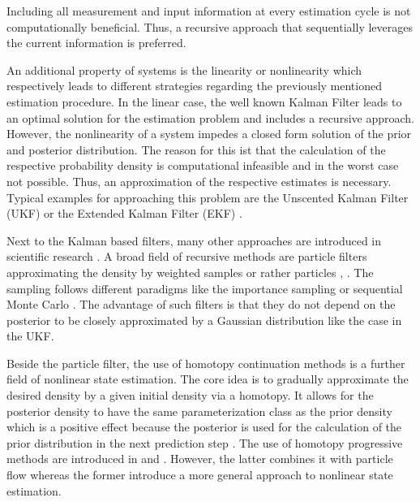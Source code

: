 \documentclass[a4paper]{IEEEtran}
\begin{document}
Including all measurement and input information at every estimation cycle is not computationally beneficial. Thus, a recursive approach that sequentially leverages the current information is preferred.

An additional property of systems is the linearity or nonlinearity which respectively leads to different strategies regarding the previously mentioned estimation procedure.
In the linear case, the well known Kalman Filter \cite{Kalman1960} leads to an optimal solution for the estimation problem and includes a recursive approach. However, the nonlinearity of a system
impedes a closed form solution of the prior and posterior distribution. The reason for this ist that the calculation of the respective probability density is computational infeasible and in the worst case not
possible. Thus, an approximation of the respective estimates is necessary. Typical examples for approaching this problem are the Unscented Kalman Filter (UKF) \cite{julier2004} or the Extended Kalman Filter (EKF) \cite{jazwinski2007}.

Next to the Kalman based filters, many other approaches are introduced in scientific research \cite{daum2005}. A broad field of recursive methods are particle filters approximating the density by weighted samples or rather particles \cite{arulampalam2002}, \cite{crisan2002}. 
The sampling follows different paradigms like the importance sampling or sequential Monte Carlo \cite{cappe2007b}. The advantage of such filters is that they do not depend on the posterior to be closely approximated by a Gaussian distribution \cite{cappe2007b} like the 
case in the UKF.

Beside the particle filter, the use of homotopy continuation methods is a further field of nonlinear state estimation. The core idea is to gradually approximate the desired density by a given initial density via a homotopy. 
It allows for the posterior density to have the same parameterization class as the prior density which is a positive effect because the posterior is used for the calculation of the prior distribution in the next prediction step \cite{hagmar2011}. 
The use of homotopy progressive methods are introduced in \cite{hanebeck2003} and \cite{daum2005}. However, the latter combines it with particle flow whereas the former introduce a more general approach to nonlinear state estimation.
\end{document}
